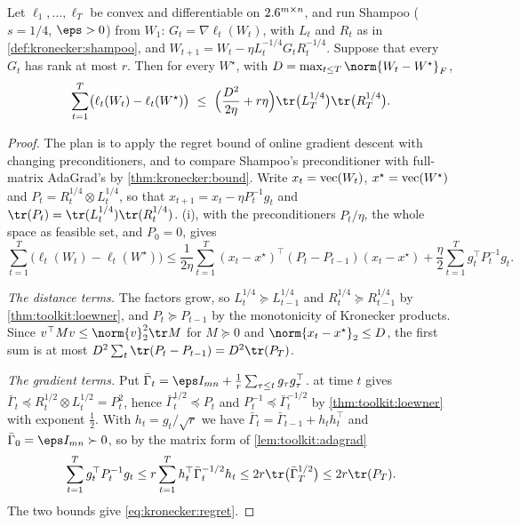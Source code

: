 \begin{refsection}
\begin{theorem}\label{thm:kronecker:regret}
Let $\ell_1,\dots,\ell_T$ be convex and differentiable on $2.6^{m\times n}$, and run Shampoo ($s=1/4$, $\eps>0$) from $W_1$: $G_t=\nabla\ell_t(W_t)$, with $L_t$ and $R_t$ as in \cref{def:kronecker:shampoo}, and $W_{t+1}=W_t-\eta L_t^{-1/4}G_tR_t^{-1/4}$. Suppose that every $G_t$ has rank at most $r$. Then for every $W^\star$, with $D=\max_{t\le T}\norm{W_t-W^\star}_F$,
\begin{equation}\label{eq:kronecker:regret}
  \sum_{t=1}^T\bigl(\ell_t(W_t)-\ell_t(W^\star)\bigr)\ \le\ \Bigl(\frac{D^2}{2\eta}+r\eta\Bigr)\tr\bigl(L_T^{1/4}\bigr)\tr\bigl(R_T^{1/4}\bigr).
\end{equation}
\end{theorem}

\begin{proof}
The plan is to apply the regret bound of online gradient descent with changing preconditioners, and to compare Shampoo's preconditioner with full-matrix AdaGrad's by \cref{thm:kronecker:bound}. Write $x_t=\operatorname{vec}(W_t)$, $x^\star=\operatorname{vec}(W^\star)$ and $P_t=R_t^{1/4}\otimes L_t^{1/4}$, so that $x_{t+1}=x_t-\eta P_t^{-1}g_t$ and $\tr(P_t)=\tr(L_t^{1/4})\tr(R_t^{1/4})$. (i), with the preconditioners $P_t/\eta$, the whole space as feasible set, and $P_0=0$, gives
\[
  \sum_{t=1}^T\bigl(\ell_t(W_t)-\ell_t(W^\star)\bigr)\le\frac1{2\eta}\sum_{t=1}^T(x_t-x^\star)^\top(P_t-P_{t-1})(x_t-x^\star)+\frac\eta2\sum_{t=1}^Tg_t^\top P_t^{-1}g_t .
\]

\emph{The distance terms.} The factors grow, so $L_t^{1/4}\succeq L_{t-1}^{1/4}$ and $R_t^{1/4}\succeq R_{t-1}^{1/4}$ by \cref{thm:toolkit:loewner}, and $P_t\succeq P_{t-1}$ by the monotonicity of Kronecker products. Since $v^\top Mv\le\norm{v}_2^2\tr M$ for $M\succeq0$ and $\norm{x_t-x^\star}_2\le D$, the first sum is at most $D^2\sum_t\tr(P_t-P_{t-1})=D^2\tr(P_T)$.

\emph{The gradient terms.} Put $\bar\Gamma_t=\eps I_{mn}+\frac1r\sum_{\tau\le t}g_\tau g_\tau^\top$.  at time $t$ gives $\bar\Gamma_t\preceq R_t^{1/2}\otimes L_t^{1/2}=P_t^2$, hence $\bar\Gamma_t^{1/2}\preceq P_t$ and $P_t^{-1}\preceq\bar\Gamma_t^{-1/2}$ by \cref{thm:toolkit:loewner} with exponent $\frac12$. With $h_t=g_t/\sqrt r$ we have $\bar\Gamma_t=\bar\Gamma_{t-1}+h_th_t^\top$ and $\bar\Gamma_0=\eps I_{mn}\succ0$, so by the matrix form of \cref{lem:toolkit:adagrad}
\[
  \sum_{t=1}^Tg_t^\top P_t^{-1}g_t\le r\sum_{t=1}^Th_t^\top\bar\Gamma_t^{-1/2}h_t\le2r\tr\bigl(\bar\Gamma_T^{1/2}\bigr)\le2r\tr(P_T).
\]
The two bounds give \eqref{eq:kronecker:regret}.
\end{proof}


\end{refsection}
